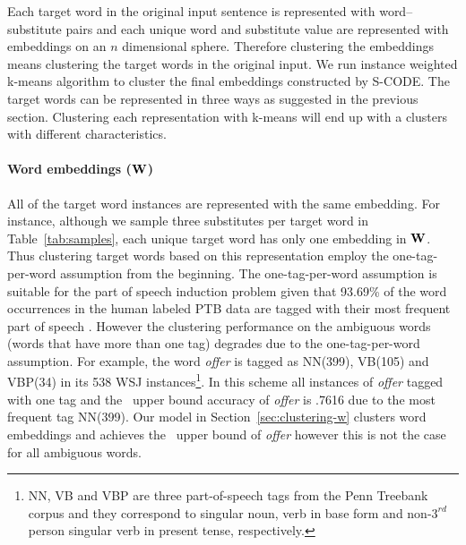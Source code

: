 Each target word in the original input sentence is represented with
word--substitute pairs and each unique word and substitute value are
represented with embeddings on an $n$ dimensional sphere.  Therefore
clustering the embeddings means clustering the target words in the
original input.  We run instance weighted k-means algorithm to cluster
the final embeddings constructed by S-CODE.  The target words can be
represented in three ways as suggested in the previous section.
Clustering each representation with k-means will end up with a
clusters with different characteristics.

\paragraph{Word embeddings (${\bf W}$)} All of the target word
instances are represented with the same embedding.  For instance,
although we sample three substitutes per target word in
Table~\ref{tab:samples}, each unique target word has only one
embedding in ${\bf W}$.  Thus clustering target words based on this
representation employ the one-tag-per-word assumption from the
beginning.  The one-tag-per-word assumption is suitable for the part
of speech induction problem given that 93.69\% of the word occurrences
in the human labeled PTB data are tagged with their most frequent part
of speech \cite{Toutanova:2003:FPT:1073445.1073478}.  However the
clustering performance on the ambiguous words (words that have more
than one tag) degrades due to the one-tag-per-word assumption.  For
example, the word {\it offer} is tagged as NN(399), VB(105) and
VBP(34) in its 538 WSJ instances\footnote{NN, VB and VBP are three
  part-of-speech tags from the Penn Treebank corpus and they
  correspond to singular noun, verb in base form and
  non-$3^{rd}$person singular verb in present tense, respectively.}.
In this scheme all instances of {\it offer} tagged with one tag
and the \mto\ upper bound accuracy of {\it offer} is .7616 due to
the most frequent tag NN(399). Our model in
Section~\ref{sec:clustering-w} clusters word embeddings and achieves
the \mto\ upper bound of {\it offer} however this is not the case
for all ambiguous words.

